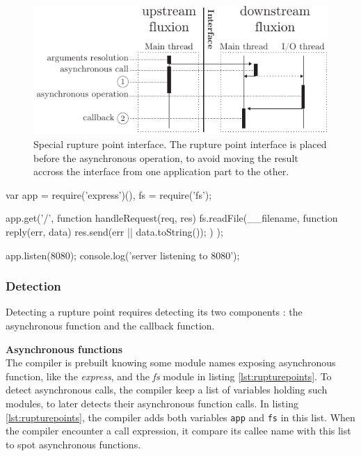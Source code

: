 \begin{figure}[h!]
\begin{center}
  \includegraphics[width=\linewidth]{ressources/specialrp.pdf}
  \caption{Special rupture point interface. \textnormal{The rupture point interface is placed before the asynchronous operation, to avoid moving the result accross the interface from one application part to the other.}}
  \label{fig:specialrp}
\end{center}
\end{figure}

\begin{code}[js, caption={Example of an application presenting the two types of rupture points : a \texttt{start} with the call to \texttt{app.get()}, and a \texttt{post} with the call to \texttt{fs.readFile()}},label={lst:rupturepoints}]
var app = require('express')(),
    fs = require('fs');

app.get('/', function handleRequest(req, res) {
  fs.readFile(__filename, function reply(err, data) {
    res.send(err || data.toString());
  })
});

app.listen(8080);
console.log('server listening to 8080');
\end{code}

\subsubsection{Detection}

Detecting a rupture point requires detecting its two components : the asynchronous function and the callback function.

\textbf{Asynchronous functions}\\
The compiler is prebuilt knowing some module names exposing asynchronous function, like the \textit{express}, and the \textit{fs} module in listing \ref{lst:rupturepoints}.
To detect asynchronous calls, the compiler keep a list of variables holding such modules, to later detects their asynchronous function calls.
In listing \ref{lst:rupturepoints}, the compiler adds both variables \texttt{app} and \texttt{fs} in this list.
When the compiler encounter a call expression, it compare its callee name with this list to spot asynchronous functions.

